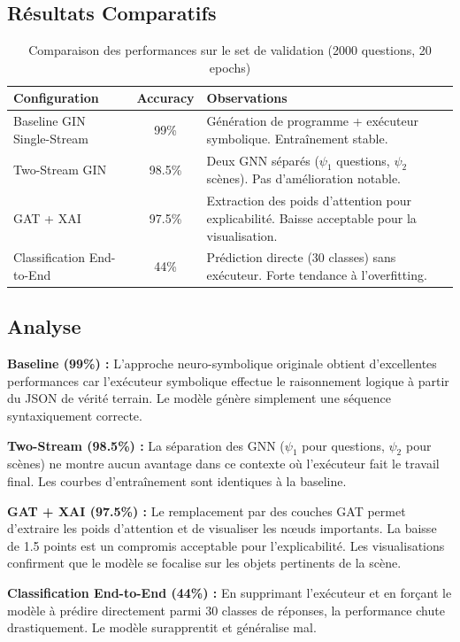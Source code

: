 \documentclass[a4paper,11pt]{article}
\begin{document}
\subsection{Résultats Comparatifs}
\begin{table}[h]
\centering
\begin{tabular}{|l|c|p{6cm}|}
\hline
\textbf{Configuration} & \textbf{Accuracy} & \textbf{Observations} \\
\hline
Baseline GIN Single-Stream & 99\% & Génération de programme + exécuteur symbolique. Entraînement stable. \\
\hline
Two-Stream GIN & 98.5\% & Deux GNN séparés ($\psi_1$ questions, $\psi_2$ scènes). Pas d'amélioration notable. \\
\hline
GAT + XAI & 97.5\% & Extraction des poids d'attention pour explicabilité. Baisse acceptable pour la visualisation. \\
\hline
Classification End-to-End & 44\% & Prédiction directe (30 classes) sans exécuteur. Forte tendance à l'overfitting. \\
\hline
\end{tabular}
\caption{Comparaison des performances sur le set de validation (2000 questions, 20 epochs)}
\end{table}

\subsection{Analyse}

\textbf{Baseline (99\%) :} L'approche neuro-symbolique originale obtient d'excellentes performances car l'exécuteur symbolique effectue le raisonnement logique à partir du JSON de vérité terrain. Le modèle génère simplement une séquence syntaxiquement correcte.

\textbf{Two-Stream (98.5\%) :} La séparation des GNN ($\psi_1$ pour questions, $\psi_2$ pour scènes) ne montre aucun avantage dans ce contexte où l'exécuteur fait le travail final. Les courbes d'entraînement sont identiques à la baseline.

\textbf{GAT + XAI (97.5\%) :} Le remplacement par des couches GAT permet d'extraire les poids d'attention et de visualiser les nœuds importants. La baisse de 1.5 points est un compromis acceptable pour l'explicabilité. Les visualisations confirment que le modèle se focalise sur les objets pertinents de la scène.

\textbf{Classification End-to-End (44\%) :} En supprimant l'exécuteur et en forçant le modèle à prédire directement parmi 30 classes de réponses, la performance chute drastiquement. Le modèle surapprentit et généralise mal.
\end{document}
